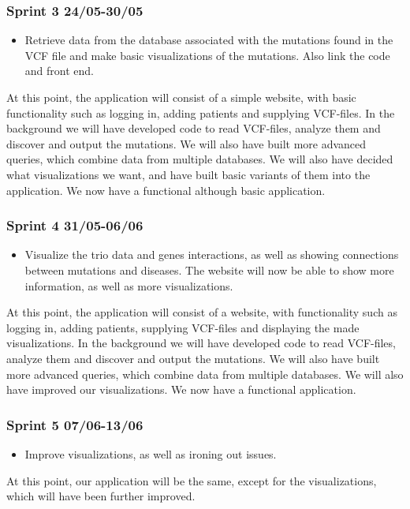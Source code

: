 	\subsubsection*{Sprint 3 24/05-30/05}
		\begin{itemize}
			\item 	Retrieve data from the database associated with the mutations found in the VCF file and make basic visualizations of the mutations. Also link the code and front end.
		\end{itemize}
		At this point, the application will consist of a simple website, with basic functionality such as logging in, adding patients and supplying VCF-files. In the background we will have developed code to read VCF-files, analyze them and discover and output the mutations. We will also have built more advanced queries, which combine data from multiple databases. We will also have decided what visualizations we want, and have built basic variants of them into the application. We now have a functional although basic application.
	
	\subsubsection*{Sprint 4 31/05-06/06}
		\begin{itemize}
			\item Visualize the trio data and genes interactions, as well as showing connections between mutations and diseases. The website will now be able to show more information, as well as more visualizations.
		\end{itemize}
		At this point, the application will consist of a website, with functionality such as logging in, adding patients, supplying VCF-files and displaying the made visualizations. In the background we will have developed code to read VCF-files, analyze them and discover and output the mutations. We will also have built more advanced queries, which combine data from multiple databases. We will also have improved our visualizations. We now have a functional application.
	
	\subsubsection*{Sprint 5 07/06-13/06}
		\begin{itemize}
			\item Improve visualizations, as well as ironing out issues.
		\end{itemize}
		At this point, our application will be the same, except for the visualizations, which will have been further improved.
	
